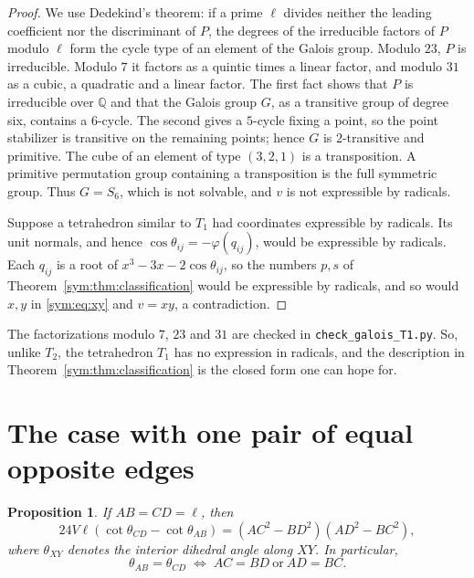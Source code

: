 \documentclass[11pt]{article}
\newtheorem{proposition}[theorem]{Proposition}
\theoremstyle{definition}
\theoremstyle{remark}
\newcommand{\ph}{\varphi}
\begin{document}
\begin{proof}
We use Dedekind's theorem: if a prime $\ell$ divides neither the leading coefficient nor the discriminant of $P$, the degrees of the irreducible factors of $P$ modulo $\ell$ form the cycle type of an element of the Galois group. Modulo $23$, $P$ is irreducible. Modulo $7$ it factors as a quintic times a linear factor, and modulo $31$ as a cubic, a quadratic and a linear factor. The first fact shows that $P$ is irreducible over $\mathbb Q$ and that the Galois group $G$, as a transitive group of degree six, contains a $6$-cycle. The second gives a $5$-cycle fixing a point, so the point stabilizer is transitive on the remaining points; hence $G$ is $2$-transitive and primitive. The cube of an element of type $(3,2,1)$ is a transposition. A primitive permutation group containing a transposition is the full symmetric group. Thus $G=S_6$, which is not solvable, and $v$ is not expressible by radicals.

Suppose a tetrahedron similar to $T_1$ had coordinates expressible by radicals. Its unit normals, and hence $\cos\theta_{ij}=-\ph(q_{ij})$, would be expressible by radicals. Each $q_{ij}$ is a root of $x^3-3x-2\cos\theta_{ij}$, so the numbers $p,s$ of Theorem~\ref{sym:thm:classification} would be expressible by radicals, and so would $x,y$ in \eqref{sym:eq:xy} and $v=xy$, a contradiction.
\end{proof}

The factorizations modulo $7$, $23$ and $31$ are checked in \texttt{check\_galois\_T1.py}. So, unlike $T_2$, the tetrahedron $T_1$ has no expression in radicals, and the description in Theorem~\ref{sym:thm:classification} is the closed form one can hope for.

\section{The case with one pair of equal opposite edges}\label{sec:onepair}

\begin{proposition}
\label{prop:cotangent}
If $AB=CD=\ell$, then
\begin{equation}
24V\ell(\cot\theta_{CD}-\cot\theta_{AB})
=(AC^2-BD^2)(AD^2-BC^2),
\label{eq:cotangent}
\end{equation}
where $\theta_{XY}$ denotes the interior dihedral angle along $XY$. In particular,
\[
\theta_{AB}=\theta_{CD}
\;\Longleftrightarrow\; AC=BD\ \text{or}\ AD=BC.
\]
\end{proposition}
\end{document}
